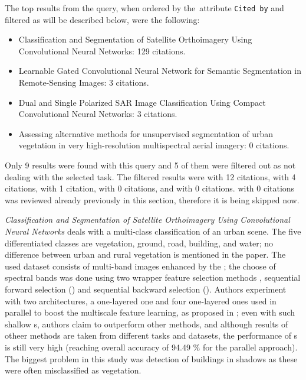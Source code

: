 \noindent The top results from the query, when ordered by the~attribute \verb|Cited by| and filtered as will be described below, were the following:

\begin{itemize}
	\item Classification and Segmentation of Satellite Orthoimagery Using Convolutional Neural Networks: 129 citations. \cite{cnn-satellite-orthoimagery}
	\item Learnable Gated Convolutional Neural Network for Semantic Segmentation in Remote-Sensing Images: 3 citations. \cite{gated-cnn-rs}
	\item Dual and Single Polarized SAR Image Classification Using Compact Convolutional Neural Networks: 3 citations. \cite{polarized-sar-cnn}
	\item Assessing alternative methods for unsupervised segmentation of urban vegetation in very high-resolution multispectral aerial imagery: 0 citations. \cite{urban-green-unsupervised-aerial}
\end{itemize}

\noindent Only 9 results were found with this query and 5 of them were filtered out as not dealing with the selected task. The filtered results were \cite{urban-green-trees-worldview} with 12 citations, \cite{cnn-urban-aerial} with 4 citations, \cite{urban-green-quantification} with 1 citation, \cite{dl-vegetation} with 0 citations, and \cite{tibet-ice-ml} with 0 citations. \cite{urban-green-unsupervised-aerial} with 0 citations was reviewed already previously in this section, therefore it is being skipped now.

\textit{Classification and Segmentation of Satellite Orthoimagery Using Convolutional Neural Networks} deals with a multi-class classification of an urban scene. The five differentiated classes are vegetation, ground, road, building, and water; no difference between urban and rural vegetation is mentioned in the paper. The used dataset consists of multi-band images enhanced by the ; the choose of spectral bands was done using two wrapper feature selection methods \cite{wrapper-feature-selection}, sequential forward selection () and sequential backward selection (). Authors experiment with two  architectures, a one-layered one and four one-layered ones used in parallel to boost the multiscale feature learning, as proposed in \cite{multiscale-parallel-cnn}; even with such shallow s, authors claim to outperform other  methods, and although results of otheer methods are taken from different tasks and datasets, the performance of s is still very high (reaching overall accuracy of 94.49 \% for the parallel approach). The biggest problem in this study was detection of buildings in shadows as these were often misclassified as vegetation.


